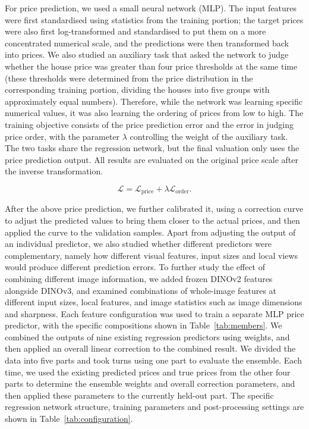 For price prediction, we used a small neural network (MLP). The input features were first standardised using statistics from the training portion; the target prices were also first log-transformed and standardised to put them on a more concentrated numerical scale, and the predictions were then transformed back into prices. We also studied an auxiliary task that asked the network to judge whether the house price was greater than four price thresholds at the same time (these thresholds were determined from the price distribution in the corresponding training portion, dividing the houses into five groups with approximately equal numbers). Therefore, while the network was learning specific numerical values, it was also learning the ordering of prices from low to high. The training objective consists of the price prediction error and the error in judging price order, with the parameter \ensuremath{\lambda} controlling the weight of the auxiliary task. The two tasks share the regression network, but the final valuation only uses the price prediction output. All results are evaluated on the original price scale after the inverse transformation.

\[
\mathcal{L}=\mathcal{L}_{\mathrm{price}}+\lambda\mathcal{L}_{\mathrm{order}}.
\]


After the above price prediction, we further calibrated it, using a correction curve to adjust the predicted values to bring them closer to the actual prices, and then applied the curve to the validation samples. Apart from adjusting the output of an individual predictor, we also studied whether different predictors were complementary, namely how different visual features, input sizes and local views would produce different prediction errors. To further study the effect of combining different image information, we added frozen DINOv2 \cite{oquab2024dinov2} features alongside DINOv3, and examined combinations of whole-image features at different input sizes, local features, and image statistics such as image dimensions and sharpness. Each feature configuration was used to train a separate MLP price predictor, with the specific compositions shown in Table~\ref{tab:members}. We combined the outputs of nine existing regression predictors using weights, and then applied an overall linear correction to the combined result. We divided the data into five parts and took turns using one part to evaluate the ensemble. Each time, we used the existing predicted prices and true prices from the other four parts to determine the ensemble weights and overall correction parameters, and then applied these parameters to the currently held-out part. The specific regression network structure, training parameters and post-processing settings are shown in Table~\ref{tab:configuration}.


